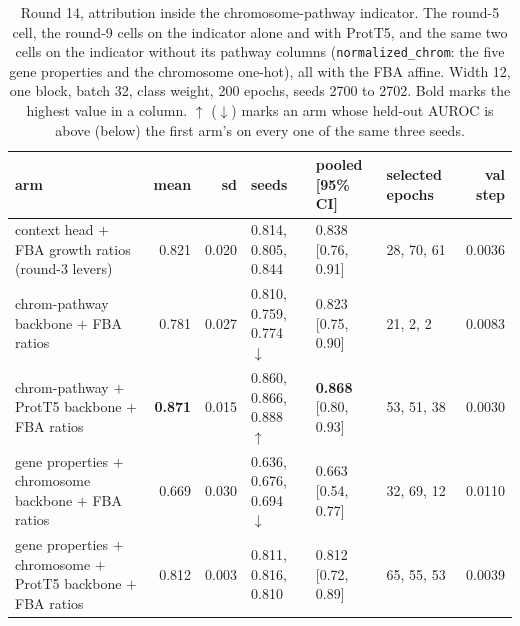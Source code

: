 \begin{table}[H]
  \centering
  \scriptsize
  \setlength{\tabcolsep}{2.5pt}
  \caption[Round 14, attribution inside the chromosome-pathway indicator]{Round 14, attribution inside the chromosome-pathway indicator. The round-5 cell, the round-9 cells on the indicator alone and with ProtT5, and the same two cells on the indicator without its pathway columns (\texttt{normalized\_chrom}: the five gene properties and the chromosome one-hot), all with the FBA affine. Width 12, one block, batch 32, class weight, 200 epochs, seeds 2700 to 2702. Bold marks the highest value in a column. $\uparrow$ ($\downarrow$) marks an arm whose held-out AUROC is above (below) the first arm's on every one of the same three seeds.}
  \label{tab:w25}
  \begin{tabular}{@{}lrrlllr@{}}
    \hline
    arm & mean & sd & seeds & pooled [95\% CI] & selected epochs & val step \\
    \hline
    context head $+$ FBA growth ratios (round-3 levers) & 0.821 & 0.020 & 0.814, 0.805, 0.844 & 0.838 [0.76, 0.91] & 28, 70, 61 & 0.0036 \\
    chrom-pathway backbone $+$ FBA ratios & 0.781 & 0.027 & 0.810, 0.759, 0.774 $\downarrow$ & 0.823 [0.75, 0.90] & 21, 2, 2 & 0.0083 \\
    chrom-pathway $+$ ProtT5 backbone $+$ FBA ratios & \textbf{0.871} & 0.015 & 0.860, 0.866, 0.888 $\uparrow$ & \textbf{0.868} [0.80, 0.93] & 53, 51, 38 & 0.0030 \\
    gene properties $+$ chromosome backbone $+$ FBA ratios & 0.669 & 0.030 & 0.636, 0.676, 0.694 $\downarrow$ & 0.663 [0.54, 0.77] & 32, 69, 12 & 0.0110 \\
    gene properties $+$ chromosome $+$ ProtT5 backbone $+$ FBA ratios & 0.812 & 0.003 & 0.811, 0.816, 0.810 & 0.812 [0.72, 0.89] & 65, 55, 53 & 0.0039 \\
    \hline
  \end{tabular}
\end{table}
